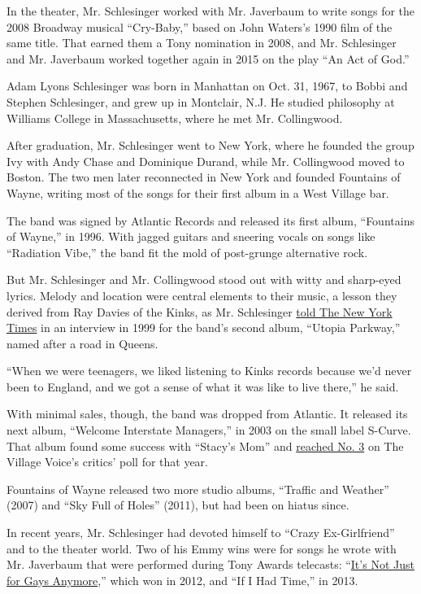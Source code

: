 In the theater, Mr. Schlesinger worked with Mr. Javerbaum to write songs
for the 2008 Broadway musical ``Cry-Baby,'' based on John Waters's 1990
film of the same title. That earned them a Tony nomination in 2008, and
Mr. Schlesinger and Mr. Javerbaum worked together again in 2015 on the
play ``An Act of God.''

Adam Lyons Schlesinger was born in Manhattan on Oct. 31, 1967, to Bobbi
and Stephen Schlesinger, and grew up in Montclair, N.J. He studied
philosophy at Williams College in Massachusetts, where he met Mr.
Collingwood.

After graduation, Mr. Schlesinger went to New York, where he founded the
group Ivy with Andy Chase and Dominique Durand, while Mr. Collingwood
moved to Boston. The two men later reconnected in New York and founded
Fountains of Wayne, writing most of the songs for their first album in a
West Village bar.

The band was signed by Atlantic Records and released its first album,
``Fountains of Wayne,'' in 1996. With jagged guitars and sneering vocals
on songs like ``Radiation Vibe,'' the band fit the mold of post-grunge
alternative rock.

But Mr. Schlesinger and Mr. Collingwood stood out with witty and
sharp-eyed lyrics. Melody and location were central elements to their
music, a lesson they derived from Ray Davies of the Kinks, as Mr.
Schlesinger
\href{https://www.nytimes3xbfgragh.onion/1999/07/09/movies/streets-new-york-with-fountains-wayne-urban-minstrels-with-roots-suburbia.html}{told
The New York Times} in an interview in 1999 for the band's second album,
``Utopia Parkway,'' named after a road in Queens.

``When we were teenagers, we liked listening to Kinks records because
we'd never been to England, and we got a sense of what it was like to
live there,'' he said.

With minimal sales, though, the band was dropped from Atlantic. It
released its next album, ``Welcome Interstate Managers,'' in 2003 on the
small label S-Curve. That album found some success with ``Stacy's Mom''
and \href{https://www.robertchristgau.com/xg/pnj/pjres03.php}{reached
No. 3} on The Village Voice's critics' poll for that year.

Fountains of Wayne released two more studio albums, ``Traffic and
Weather'' (2007) and ``Sky Full of Holes'' (2011), but had been on
hiatus since.

In recent years, Mr. Schlesinger had devoted himself to ``Crazy
Ex-Girlfriend'' and to the theater world. Two of his Emmy wins were for
songs he wrote with Mr. Javerbaum that were performed during Tony Awards
telecasts: ``\href{https://www.youtube.com/watch?v=3BHyfYiBt5o}{It's Not
Just for Gays Anymore},'' which won in 2012, and ``If I Had Time,'' in
2013.

